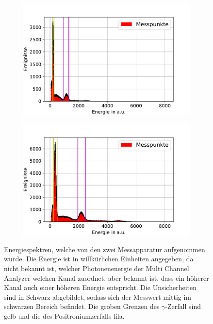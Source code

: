 \documentclass[
	a4paper,
	12pt,
	pagesize,
	ngerman
]{scrartcl}
\begin{document}
	\begin{figure}[H]
		\centering
	\begin{subfigure}[b]{0.8\textwidth}
				\includegraphics[width= 1 \linewidth]{img/Energiespektrum_Start}
				\caption{}
				\label{fig_energy_start}
		\end{subfigure}
	\begin{subfigure}[b]{0.8\textwidth}
				\includegraphics[width= 1 \linewidth]{img/Energiespektrum_Stop}
				\caption{}
				\label{fig_energy_stop}
		\end{subfigure}
		\caption{
				Energiespektren, welche von den zwei Messapparatur aufgenommen wurde.
				Die Energie ist in willkürlichen Einheiten angegeben, da nicht bekannt ist, welcher Photonenenergie der Multi Channel Analyzer welchen Kanal zuordnet, aber bekannt ist, dass ein höherer Kanal auch einer höheren Energie entspricht.
				Die Unsicherheiten sind in Schwarz abgebildet, sodass sich der Messwert mittig im schwarzen Bereich befindet.
				Die groben Grenzen des $\gamma$-Zerfall sind gelb und die des Positroniumzerfalls lila. %
				}
		\end{figure}
\end{document}
